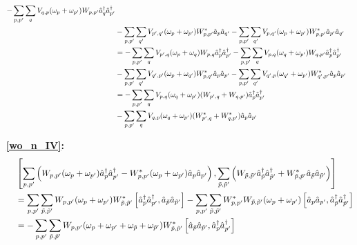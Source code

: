 \begin{appendix}
\begin{itemize}
\begin{align}
-\sum\limits_{p,p^\prime}\sum\limits_{ q}V_{ q, p}(\omega_p+\omega_{p^\prime})W_{p,p^\prime}\hat a^\dagger_q\hat a^\dagger_{p^\prime} \nonumber \\ \quad& 
-\sum\limits_{p,p^\prime}\sum\limits_{ q^\prime}V_{ p^\prime, q^\prime}(\omega_p+\omega_{p^\prime})W_{p,p^\prime}^*\hat a_p\hat a_{q^\prime}
-\sum\limits_{p,p^\prime}\sum\limits_{ q^\prime}V_{ p, q^\prime}(\omega_p+\omega_{p^\prime})W_{p,p^\prime}^*\hat a_{p^\prime}\hat a_{q^\prime}\nonumber \\ \quad& 
=-\sum\limits_{p,p^\prime}\sum\limits_{q}V_{ {p^\prime},q}(\omega_p+\omega_{q})W_{p,q}\hat a^\dagger_p\hat a^\dagger_{p^\prime}
-\sum\limits_{p,p^\prime}\sum\limits_{ q}V_{ p, q}(\omega_q+\omega_{p^\prime})W_{q,p^\prime}\hat a^\dagger_p\hat a^\dagger_{p^\prime} \nonumber \\ \quad& 
-\sum\limits_{p,p^\prime}\sum\limits_{ q^\prime}V_{ q^\prime, p^\prime}(\omega_p+\omega_{q^\prime})W_{p,q^\prime}^*\hat a_p\hat a_{p^\prime}
-\sum\limits_{p,p^\prime}\sum\limits_{ q^\prime}V_{ q^\prime, p}(\omega_{q^\prime}+\omega_{p^\prime})W_{q^\prime,p^\prime}^*\hat a_{p}\hat a_{p^\prime}\nonumber \\ \quad& 
=-\sum\limits_{p,p^\prime}\sum\limits_{ q}V_{ p, q}(\omega_q+\omega_{p^\prime})(W_{p^\prime,q}+W_{q,p^\prime})\hat a^\dagger_p\hat a^\dagger_{p^\prime} \nonumber \\ \quad& 
-\sum\limits_{p,p^\prime}\sum\limits_{ q}V_{ q, p}(\omega_{q}+\omega_{p^\prime})(W_{p^\prime,q}^*+W_{q,p^\prime}^*)\hat a_{p}\hat a_{p^\prime}
\end{align}
\item [\textbf{\ref{wo_n_IV}:}]
\begin{align}
&\left[\Sum_{p,p^\prime}\left(W_{p,p^\prime}(\omega_p+\omega_{p^\prime})\CR_p\CR_{p^\prime}-W_{p,p^\prime}^*(\omega_p+\omega_{p^\prime})\AN_p\AN_{p^\prime}\right),\Sum_{\tilde p,\tilde p^\prime}\left(W_{\tilde p,\tilde p^\prime}\CR_{\tilde p}\CR_{\tilde p^\prime}+W_{\tilde p,\tilde p^\prime}^*\AN_{\tilde p}\AN_{\tilde p^\prime}\right)\right] \nonumber \\ \quad& 
=\Sum_{p,p^\prime}\Sum_{\tilde p,\tilde p^\prime}W_{p,p^\prime}(\omega_p+\omega_{p^\prime})W_{\tilde p,\tilde p^\prime}^*\left[\CR_p\CR_{p^\prime},\AN_{\tilde p}\AN_{\tilde p^\prime}\right]
-\Sum_{p,p^\prime}\Sum_{\tilde p,\tilde p^\prime} W_{p,p^\prime}^*W_{\tilde p,\tilde p^\prime}(\omega_p+\omega_{p^\prime})\left[\AN_p\AN_{p^\prime},\CR_{\tilde p}\CR_{\tilde p^\prime}\right] \nonumber \\ \quad& 
=-\Sum_{p,p^\prime}\Sum_{\tilde p,\tilde p^\prime}W_{p,p^\prime}(\omega_p+\omega_{p^\prime}+\omega_{\tilde p}+\omega_{\tilde p^\prime})W_{\tilde p,\tilde p^\prime}^*\left[\AN_{\tilde p}\AN_{\tilde p^\prime},\CR_p\CR_{p^\prime}\right] \nonumber \\ \quad& 

\end{align}
\end{itemize}
\end{appendix}
